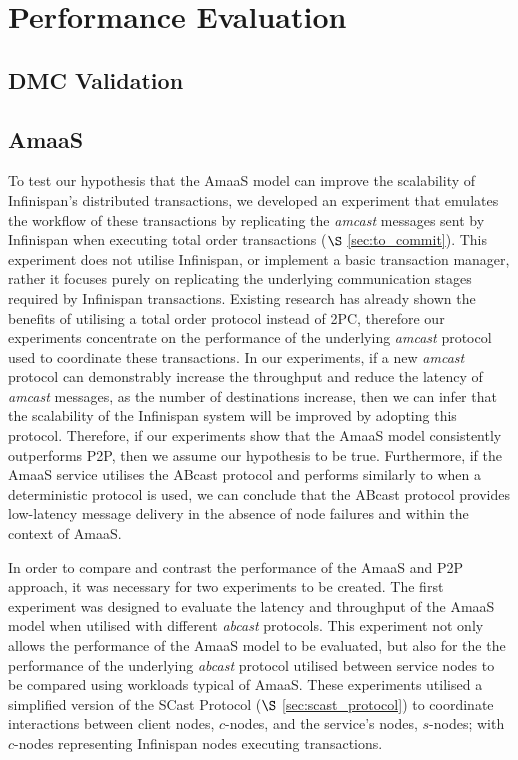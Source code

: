 \chapter{Performance Evaluation}

    \graphicspath{{Chapter6-PerformanceEvaluation/Figs/Vector/}{Chapter6-PerformanceEvaluation/Figs/}}
    

\section{DMC Validation}

\section{AmaaS}
	To test our hypothesis that the \textsf{AmaaS} model can improve the scalability of Infinispan's distributed transactions, we developed an experiment that emulates the workflow of these transactions by replicating the \emph{amcast} messages sent by Infinispan when executing total order transactions ($\S$ \ref{sec:to_commit}).  This experiment does not utilise Infinispan, or implement a basic transaction manager, rather it focuses purely on replicating the underlying communication stages required by Infinispan transactions.  Existing research \citep{Ruivo:2011:ETO:2120967.2121604} has already shown the benefits of utilising a total order protocol instead of 2PC, therefore our experiments concentrate on the performance of the underlying \emph{amcast} protocol used to coordinate these transactions.  In our experiments, if a new \emph{amcast} protocol can demonstrably increase the throughput and reduce the latency of \emph{amcast} messages, as the number of destinations increase,  then we can infer that the scalability of the Infinispan system will be improved by adopting this protocol.  Therefore, if our experiments show that the \textsf{AmaaS} model consistently outperforms P2P, then we assume our hypothesis to be true. Furthermore, if the \textsf{AmaaS} service utilises the \textsf{ABcast} protocol and performs similarly to when a deterministic protocol is used, we can conclude that the \textsf{ABcast} protocol provides low-latency message delivery in the absence of node failures and within the context of \textsf{AmaaS}.  
	
   In order to compare and contrast the performance of the \textsf{AmaaS} and P2P approach, it was necessary for two experiments to be created.  The first experiment was designed to evaluate the latency and throughput of the \textsf{AmaaS} model when utilised with different \emph{abcast} protocols.  This experiment not only allows the performance of the \textsf{AmaaS} model to be evaluated, but also for the the performance of the underlying \emph{abcast} protocol utilised between service nodes to be compared using workloads typical of \textsf{AmaaS}.  These experiments utilised a simplified version of the \textsf{SCast} Protocol ($\S$ \ref{sec:scast_protocol}) to coordinate interactions between client nodes, $c$-nodes, and the service's nodes, $s$-nodes; with $c$-nodes representing Infinispan nodes executing transactions.  
   
